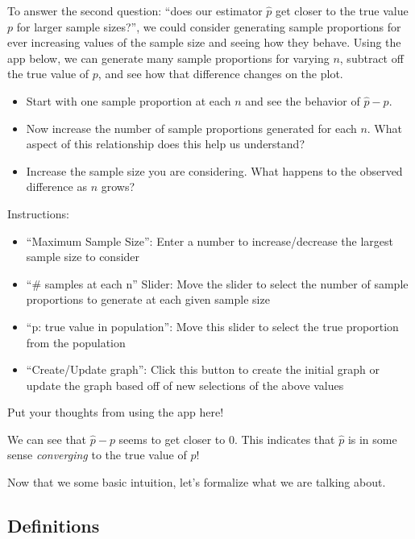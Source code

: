 \documentclass[
]{article}
\providecommand{\tightlist}{%
  \setlength{\itemsep}{0pt}\setlength{\parskip}{0pt}}
\begin{document}
To answer the second question: ``does our estimator \(\hat{p}\) get
closer to the true value \(p\) for larger sample sizes?'', we could
consider generating sample proportions for ever increasing values of the
sample size and seeing how they behave. Using the app below, we can
generate many sample proportions for varying \(n\), subtract off the
true value of \(p\), and see how that difference changes on the plot.

\begin{itemize}
\tightlist
\item
  Start with one sample proportion at each \(n\) and see the behavior of
  \(\hat{p}-p\).
\item
  Now increase the number of sample proportions generated for each
  \(n\). What aspect of this relationship does this help us understand?
\item
  Increase the sample size you are considering. What happens to the
  observed difference as \(n\) grows?
\end{itemize}

Instructions:

\begin{itemize}
\tightlist
\item
  ``Maximum Sample Size'': Enter a number to increase/decrease the
  largest sample size to consider
\item
  ``\# samples at each n'' Slider: Move the slider to select the number
  of sample proportions to generate at each given sample size
\item
  ``p: true value in population'': Move this slider to select the true
  proportion from the population
\item
  ``Create/Update graph'': Click this button to create the initial graph
  or update the graph based off of new selections of the above values
\end{itemize}

Put your thoughts from using the app here!

We can see that \(\hat{p}-p\) seems to get closer to 0. This indicates
that \(\hat{p}\) is in some sense \emph{converging} to the true value of
\(p\)!

Now that we some basic intuition, let's formalize what we are talking
about.

\hypertarget{definitions}{%
\subsection{Definitions}\label{definitions}}
\end{document}
